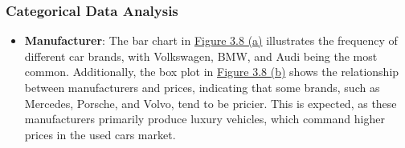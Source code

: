 \begin{itemize}
\end{itemize}

\subsubsection{Categorical Data Analysis}

\begin{itemize}
    \item \textbf{Manufacturer}: The bar chart in \hyperref[fig:manufacturer-hist]{Figure 3.8 (a)} illustrates the frequency of different car brands, with Volkswagen, BMW, and Audi being the most common. Additionally, the box plot in \hyperref[fig:manufacturer-box]{Figure 3.8 (b)} shows the relationship between manufacturers and prices, indicating that some brands, such as Mercedes, Porsche, and Volvo, tend to be pricier. This is expected, as these manufacturers primarily produce luxury vehicles, which command higher prices in the used cars market.


\end{itemize}
